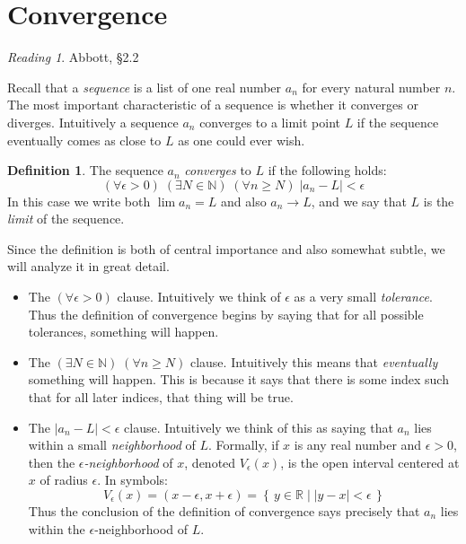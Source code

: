 \documentclass[11pt,oneside]{amsbook}
\newcommand{\set}[1]{\left\{\,#1\,\right\}}
\newcommand{\N}{\mathbb N}
\newcommand{\R}{\mathbb R}
\theoremstyle{definition}
\theoremstyle{plain}
\theoremstyle{definition}
\newtheorem{defn}[thm]{Definition}
\theoremstyle{remark}
\newtheorem*{reading}{Reading}
\numberwithin{equation}{section}
\numberwithin{figure}{section}
\begin{document}
\newpage
\section{Convergence}

\begin{reading}
  Abbott, \S 2.2
\end{reading}

Recall that a \emph{sequence} is a list of one real number $a_n$ for every natural number $n$. The most important characteristic of a sequence is whether it converges or diverges. Intuitively a sequence $a_n$ converges to a limit point $L$ if the sequence eventually comes as close to $L$ as one could ever wish.

\begin{defn}
  The sequence $a_n$ \emph{converges} to $L$ if the following holds:
  \[(\forall\epsilon>0)\;(\exists N\in\N)\;(\forall n\geq N)\;|a_n-L|<\epsilon
  \]
  In this case we write both $\lim a_n=L$ and also $a_n\to L$, and we say that $L$ is the \emph{limit} of the sequence.
\end{defn}

Since the definition is both of central importance and also somewhat subtle, we will analyze it in great detail.

\begin{itemize}
\item The $(\forall\epsilon>0)$ clause. Intuitively we think of $\epsilon$ as a very small \emph{tolerance}. Thus the definition of convergence begins by saying that for all possible tolerances, something will happen.
\item The $(\exists N\in\N)\;(\forall n\geq N)$ clause. Intuitively this means that \emph{eventually} something will happen. This is because it says that there is some index such that for all later indices, that thing will be true.
\item The $|a_n-L|<\epsilon$ clause. Intuitively we think of this as saying that $a_n$ lies within a small \emph{neighborhood} of $L$. Formally, if $x$ is any real number and $\epsilon>0$, then the \emph{$\epsilon$-neighborhood} of $x$, denoted $V_\epsilon(x)$, is the open interval centered at $x$ of radius $\epsilon$. In symbols:
  \[V_\epsilon(x)=(x-\epsilon,x+\epsilon)=\set{y\in\R\mid|y-x|<\epsilon}
  \]
  Thus the conclusion of the definition of convergence says precisely that $a_n$ lies within the $\epsilon$-neighborhood of $L$.
\end{itemize}
\end{document}
